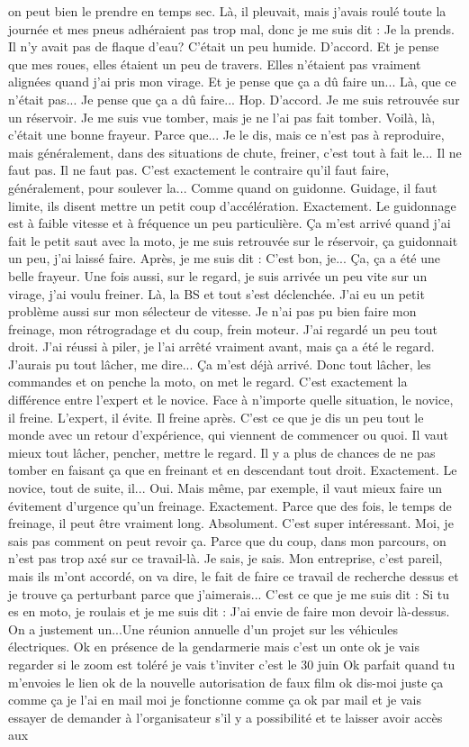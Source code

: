 on peut bien le prendre en temps sec. Là, il pleuvait, mais j'avais roulé toute la journée et mes pneus adhéraient pas trop mal, donc je me suis dit : Je la prends. Il n'y avait pas de flaque d'eau? C'était un peu humide. D'accord. Et je pense que mes roues, elles étaient un peu de travers. Elles n'étaient pas vraiment alignées quand j'ai pris mon virage. Et je pense que ça a dû faire un... Là, que ce n'était pas... Je pense que ça a dû faire... Hop. D'accord. Je me suis retrouvée sur un réservoir. Je me suis vue tomber, mais je ne l'ai pas fait tomber. Voilà, là, c'était une bonne frayeur. Parce que... Je le dis, mais ce n'est pas à reproduire, mais généralement, dans des situations de chute, freiner, c'est tout à fait le... Il ne faut pas. Il ne faut pas. C'est exactement le contraire qu'il faut faire, généralement, pour soulever la... Comme quand on guidonne. Guidage, il faut limite, ils disent mettre un petit coup d'accélération. Exactement. Le guidonnage est à faible vitesse et à fréquence un peu particulière. Ça m'est arrivé quand j'ai fait le petit saut avec la moto, je me suis retrouvée sur le réservoir, ça guidonnait un peu, j'ai laissé faire. Après, je me suis dit : C'est bon, je... Ça, ça a été une belle frayeur. Une fois aussi, sur le regard, je suis arrivée un peu vite sur un virage, j'ai voulu freiner. Là, la BS et tout s'est déclenchée. J'ai eu un petit problème aussi sur mon sélecteur de vitesse. Je n'ai pas pu bien faire mon freinage, mon rétrogradage et du coup, frein moteur. J'ai regardé un peu tout droit. J'ai réussi à piler, je l'ai arrêté vraiment avant, mais ça a été le regard. J'aurais pu tout lâcher, me dire... Ça m'est déjà arrivé. Donc tout lâcher, les commandes et on penche la moto, on met le regard. C'est exactement la différence entre l'expert et le novice. Face à n'importe quelle situation, le novice, il freine. L'expert, il évite. Il freine après. C'est ce que je dis un peu tout le monde avec un retour d'expérience, qui viennent de commencer ou quoi. Il vaut mieux tout lâcher, pencher, mettre le regard. Il y a plus de chances de ne pas tomber en faisant ça que en freinant et en descendant tout droit. Exactement. Le novice, tout de suite, il... Oui. Mais même, par exemple, il vaut mieux faire un évitement d'urgence qu'un freinage. Exactement. Parce que des fois, le temps de freinage, il peut être vraiment long. Absolument. C'est super intéressant. Moi, je sais pas comment on peut revoir ça. Parce que du coup, dans mon parcours, on n'est pas trop axé sur ce travail-là. Je sais, je sais. Mon entreprise, c'est pareil, mais ils m'ont accordé, on va dire, le fait de faire ce travail de recherche dessus et je trouve ça perturbant parce que j'aimerais... C'est ce que je me suis dit : Si tu es en moto, je roulais et je me suis dit : J'ai envie de faire mon devoir là-dessus. On a justement un...Une réunion annuelle d'un projet sur les véhicules électriques. Ok en présence de la gendarmerie mais c'est un onte ok je vais regarder si le zoom est toléré je vais t'inviter c'est le 30 juin Ok parfait quand tu m'envoies le lien ok de la nouvelle autorisation de faux film ok dis-moi juste ça comme ça je l'ai en mail moi je fonctionne comme ça ok par mail et je vais essayer de demander à l'organisateur s'il y a possibilité et te laisser avoir accès aux 